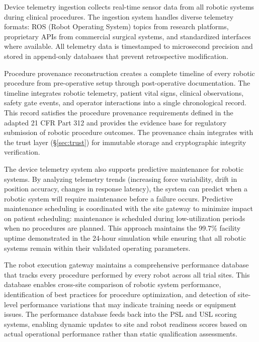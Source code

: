 Device telemetry ingestion collects real-time sensor data from all robotic systems during
clinical procedures. The ingestion system handles diverse telemetry formats: ROS
(Robot Operating System) topics from research platforms, proprietary APIs from commercial
surgical systems, and standardized interfaces where available. All telemetry data is
timestamped to microsecond precision and stored in append-only databases that prevent
retrospective modification.

Procedure provenance reconstruction creates a complete timeline of every robotic procedure
from pre-operative setup through post-operative documentation. The timeline integrates
robotic telemetry, patient vital signs, clinical observations, safety gate events, and
operator interactions into a single chronological record. This record satisfies the
procedure provenance requirements defined in the adapted 21 CFR Part 312 \cite{cfr312-adapt}
and provides the evidence base for regulatory submission of robotic procedure outcomes.
The provenance chain integrates with the trust layer (\S\ref{sec:trust}) for immutable
storage and cryptographic integrity verification.

The device telemetry system also supports predictive maintenance for robotic systems. By
analyzing telemetry trends (increasing force variability, drift in position accuracy,
changes in response latency), the system can predict when a robotic system will require
maintenance before a failure occurs. Predictive maintenance scheduling is coordinated with
the site gateway to minimize impact on patient scheduling: maintenance is scheduled during
low-utilization periods when no procedures are planned. This approach maintains the 99.7\%
facility uptime demonstrated in the 24-hour simulation \cite{main-repo} while ensuring
that all robotic systems remain within their validated operating parameters.

The robot execution gateway maintains a comprehensive performance database that tracks
every procedure performed by every robot across all trial sites. This database enables
cross-site comparison of robotic system performance, identification of best practices for
procedure optimization, and detection of site-level performance variations that may
indicate training needs or equipment issues. The performance database feeds back into the
PSL and USL scoring systems, enabling dynamic updates to site and robot readiness scores
based on actual operational performance rather than static qualification assessments.
